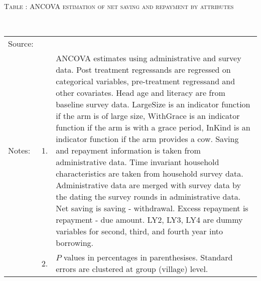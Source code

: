 \hspace{-1cm}\begin{minipage}[t]{14cm}
\hfil\textsc{\normalsize Table \thetable: ANCOVA estimation of net saving and repayment by attributes\label{tab ANCOVA Repayment attributes}}\\
\setlength{\tabcolsep}{1pt}
\setlength{\baselineskip}{8pt}
\renewcommand{\arraystretch}{.55}
\hspace{-.75cm}\\
\renewcommand{\arraystretch}{.8}
\setlength{\tabcolsep}{1pt}
\begin{tabular}{>{\hfill\scriptsize}p{1cm}<{}>{\hfill\scriptsize}p{.25cm}<{}>{\scriptsize}p{12cm}<{\hfill}}
Source:& \multicolumn{2}{l}{\scriptsize Estimated with GUK administrative and survey data.}\\
Notes: & 1. & ANCOVA estimates using administrative and survey data. Post treatment regressands are regressed on categorical variables, pre-treatment regressand and other covariates. Head age and literacy are from baseline survey data.  \textsf{LargeSize} is an indicator function if the arm is of large size, \textsf{WithGrace} is an indicator function if the arm is with a grace period, \textsf{InKind} is an indicator function if the arm provides a cow. Saving and repayment information is taken from administrative data. Time invariant household characteristics are taken from household survey data. Administrative data are merged with survey data by the dating the survey rounds in administrative data. Net saving is saving - withdrawal. Excess repayment is repayment - due amount. \textsf{LY2, LY3, LY4} are dummy variables for second, third, and 	fourth year into borrowing.\\
& 2. & $P$ values in percentages in parenthesises. Standard errors are clustered at group (village) level.
\end{tabular}
\end{minipage}

